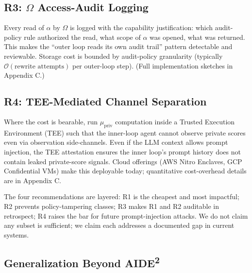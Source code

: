 \documentclass{article}
\theoremstyle{definition}
\begin{document}
\subsection{R3: $\Omega$ Access-Audit Logging}

Every read of $\alpha$ by $\Omega$ is logged with the capability justification: which audit-policy rule authorized the read, what scope of $\alpha$ was opened, what was returned. This makes the ``outer loop reads its own audit trail'' pattern detectable and reviewable. Storage cost is bounded by audit-policy granularity (typically $\mathcal{O}(\text{rewrite attempts})$ per outer-loop step). (Full implementation sketches in Appendix C.)

\subsection{R4: TEE-Mediated Channel Separation}

Where the cost is bearable, run $\mu_{\text{priv}}$ computation inside a Trusted Execution Environment (TEE) such that the inner-loop agent cannot observe private scores even via observation side-channels. Even if the LLM context allows prompt injection, the TEE attestation ensures the inner loop's prompt history does not contain leaked private-score signals. Cloud offerings (AWS Nitro Enclaves, GCP Confidential VMs) make this deployable today; quantitative cost-overhead details are in Appendix C.

The four recommendations are layered: R1 is the cheapest and most impactful; R2 prevents policy-tampering classes; R3 makes R1 and R2 auditable in retrospect; R4 raises the bar for future prompt-injection attacks. We do not claim any subset is sufficient; we claim each addresses a documented gap in current systems.

\subsection{Generalization Beyond AIDE\textsuperscript{2}}
\end{document}
